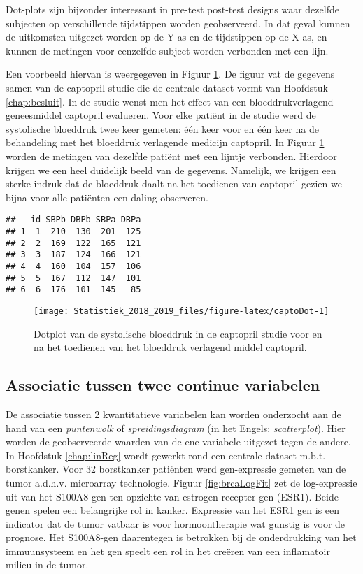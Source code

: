\documentclass[12pt,dutch,coursenotes]{book}
\theoremstyle{definition}
\theoremstyle{definition}
\theoremstyle{definition}
\theoremstyle{remark}
\begin{document}
Dot-plots zijn bijzonder interessant in pre-test post-test designs waar
dezelfde subjecten op verschillende tijdstippen worden geobserveerd. In
dat geval kunnen de uitkomsten uitgezet worden op de Y-as en de
tijdstippen op de X-as, en kunnen de metingen voor eenzelfde subject
worden verbonden met een lijn.

Een voorbeeld hiervan is weergegeven in Figuur \ref{fig:captoDot}. De
figuur vat de gegevens samen van de captopril studie die de centrale
dataset vormt van Hoofdstuk \ref{chap:besluit}. In de studie wenst men
het effect van een bloeddrukverlagend geneesmiddel captopril evalueren.
Voor elke patiënt in de studie werd de systolische bloeddruk twee keer
gemeten: één keer voor en één keer na de behandeling met het bloeddruk
verlagende medicijn captopril. In Figuur \ref{fig:captoDot} worden de
metingen van dezelfde patiënt met een lijntje verbonden. Hierdoor
krijgen we een heel duidelijk beeld van de gegevens. Namelijk, we
krijgen een sterke indruk dat de bloeddruk daalt na het toedienen van
captopril gezien we bijna voor alle patiënten een daling observeren.

\begin{verbatim}
##   id SBPb DBPb SBPa DBPa
## 1  1  210  130  201  125
## 2  2  169  122  165  121
## 3  3  187  124  166  121
## 4  4  160  104  157  106
## 5  5  167  112  147  101
## 6  6  176  101  145   85
\end{verbatim}

\begin{figure}

{\centering \texttt{[image: Statistiek\_2018\_2019\_files/figure-latex/captoDot-1]} 

}

\caption{Dotplot van de systolische bloeddruk in de captopril studie voor en na het toedienen van het bloeddruk verlagend middel captopril.}\label{fig:captoDot}
\end{figure}

\subsection{Associatie tussen twee continue
variabelen}\label{sec:correlatie}

De associatie tussen 2 kwantitatieve variabelen kan worden onderzocht
aan de hand van een \emph{puntenwolk} of \emph{spreidingsdiagram} (in
het Engels: \emph{scatterplot}). Hier worden de geobserveerde waarden
van de ene variabele uitgezet tegen de andere. In Hoofdstuk
\ref{chap:linReg} wordt gewerkt rond een centrale dataset m.b.t.
borstkanker. Voor 32 borstkanker patiënten werd gen-expressie gemeten
van de tumor a.d.h.v. microarray technologie. Figuur
\ref{fig:brcaLogFit} zet de log-expressie uit van het S100A8 gen ten
opzichte van estrogen recepter gen (ESR1). Beide genen spelen een
belangrijke rol in kanker. Expressie van het ESR1 gen is een indicator
dat de tumor vatbaar is voor hormoontherapie wat gunstig is voor de
prognose. Het S100A8-gen daarentegen is betrokken bij de onderdrukking
van het immuunsysteem en het gen speelt een rol in het creëren van een
inflamatoir milieu in de tumor.
\end{document}
